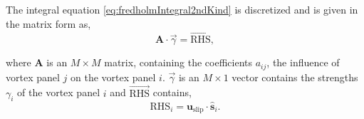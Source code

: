 
The integral equation \ref{eq:fredholmIntegral2ndKind} is discretized and is given in the matrix form as,
\begin{equation}
\mathbf{A} \cdot \vec{\gamma} = {\overrightarrow{\mathrm{RHS}}},
\label{eq:la_panelProblem}
\end{equation}

where $\mathbf{A}$ is an $M{\times}M$ matrix, containing the coefficients $a_{ij}$, the influence of vortex panel $j$ on the vortex panel $i$. $\vec{\gamma}$ is an $M\times1$ vector contains the strengths $\gamma_i$ of the vortex panel $i$ and ${\overrightarrow{\mathrm{RHS}}}$ contains,
\begin{equation}
\mathrm{RHS}_i = \mathbf{u}_{\mathrm{slip}}\cdot\hat{\mathbf{s}}_i.
\end{equation}

